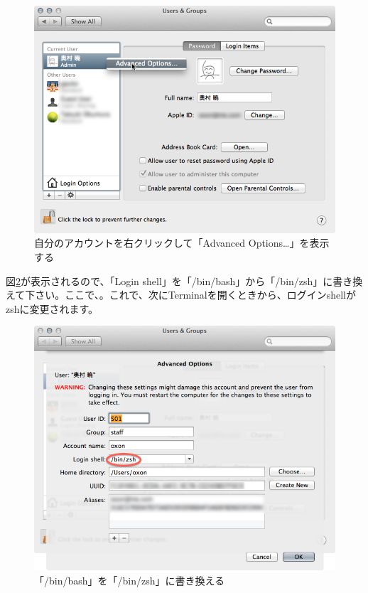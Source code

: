 \begin{figure}
  \centering
  \includegraphics[scale=0.35]{fig/zsh1.png}
  \caption{自分のアカウントを右クリックして「Advanced Options\ldots」を表示する}
  \label{fig_zsh1_png}
\end{figure}

図\ref{fig_zsh2_png}が表示されるので、「Login shell」を「/bin/bash」から「/bin/zsh」に書き換えて下さい。ここで、{\bf{}}。これで、次にTerminalを開くときから、ログインshellがzshに変更されます。

\begin{figure}
  \centering
  \includegraphics[scale=0.35]{fig/zsh2.png}
  \caption{「/bin/bash」を「/bin/zsh」に書き換える}
  \label{fig_zsh2_png}
\end{figure}

